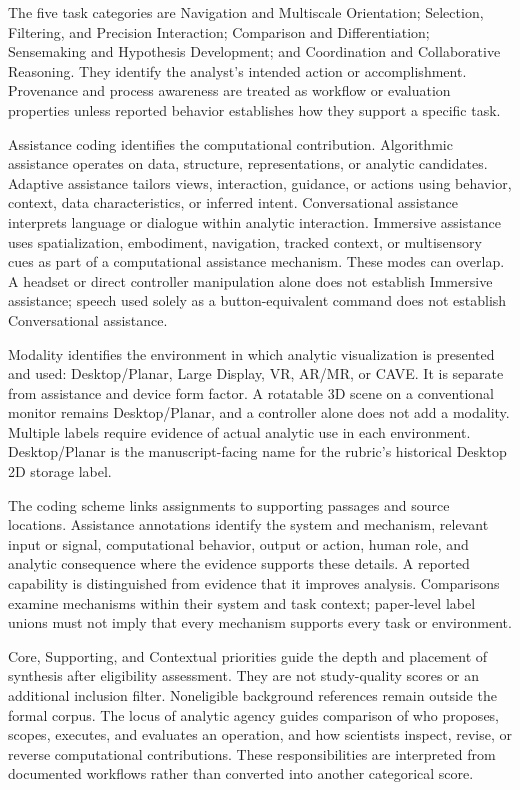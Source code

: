 The five task categories are Navigation and Multiscale Orientation; Selection, Filtering, and Precision Interaction; Comparison and Differentiation; Sensemaking and Hypothesis Development; and Coordination and Collaborative Reasoning. They identify the analyst's intended action or accomplishment. Provenance and process awareness are treated as workflow or evaluation properties unless reported behavior establishes how they support a specific task.

Assistance coding identifies the computational contribution. Algorithmic assistance operates on data, structure, representations, or analytic candidates. Adaptive assistance tailors views, interaction, guidance, or actions using behavior, context, data characteristics, or inferred intent. Conversational assistance interprets language or dialogue within analytic interaction. Immersive assistance uses spatialization, embodiment, navigation, tracked context, or multisensory cues as part of a computational assistance mechanism. These modes can overlap. A headset or direct controller manipulation alone does not establish Immersive assistance; speech used solely as a button-equivalent command does not establish Conversational assistance.

Modality identifies the environment in which analytic visualization is presented and used: Desktop/Planar, Large Display, VR, AR/MR, or CAVE. It is separate from assistance and device form factor. A rotatable 3D scene on a conventional monitor remains Desktop/Planar, and a controller alone does not add a modality. Multiple labels require evidence of actual analytic use in each environment. Desktop/Planar is the manuscript-facing name for the rubric's historical Desktop 2D storage label.

The coding scheme links assignments to supporting passages and source locations. Assistance annotations identify the system and mechanism, relevant input or signal, computational behavior, output or action, human role, and analytic consequence where the evidence supports these details. A reported capability is distinguished from evidence that it improves analysis. Comparisons examine mechanisms within their system and task context; paper-level label unions must not imply that every mechanism supports every task or environment.

Core, Supporting, and Contextual priorities guide the depth and placement of synthesis after eligibility assessment. They are not study-quality scores or an additional inclusion filter. Noneligible background references remain outside the formal corpus. The locus of analytic agency guides comparison of who proposes, scopes, executes, and evaluates an operation, and how scientists inspect, revise, or reverse computational contributions. These responsibilities are interpreted from documented workflows rather than converted into another categorical score.

